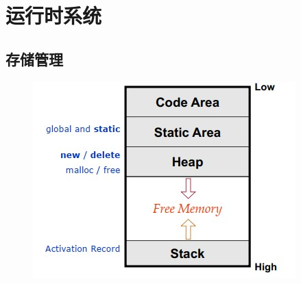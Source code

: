 
\section{运行时系统}
\subsection{存储管理}
\begin{figure}[H]
\centering
\includegraphics[width=0.5\linewidth]{fig/stack.jpg}
\end{figure}

